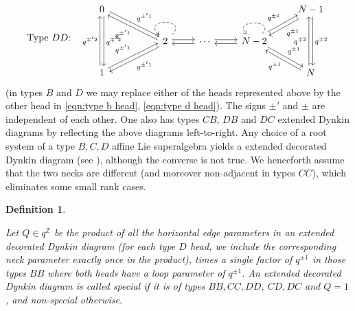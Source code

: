 \documentclass{amsart}
\newtheorem{definition}[subsection]{Definition}
\def\BZ{{\mathbb{Z}}}
\begin{document}
\begin{equation}
\label{eqn:dynkin dd}
\text{Type $DD$:} \quad \begin{tikzcd}
0 &[1cm]&&& N-1 \\
& 2 & \cdots & {N-2} & \\
1 &&&& N
\arrow["q^{\pm' 1}", shift left=2pt, from=1-1, to=2-2]
\arrow["q^{\pm' 1}", shift left=2pt, from=2-2, to=1-1]
\arrow["q^{\pm' 1}", shift left=2pt, from=3-1, to=2-2]
\arrow["q^{\pm' 1}", shift left=2pt, from=2-2, to=3-1]
\arrow["q^{\pm 1}", shift left=2pt, from=1-5, to=2-4]
\arrow["q^{\pm 1}", shift left=2pt, from=2-4, to=1-5]
\arrow["q^{\pm 1}", shift left=2pt, from=3-5, to=2-4]
\arrow["q^{\pm 1}", shift left=2pt, from=2-4, to=3-5]
\arrow["q^{\mp 2}", shift left=2pt, from=3-5, to=1-5]
\arrow["q^{\mp 2}", shift left=2pt, from=1-5, to=3-5]
\arrow["q^{\mp' 2}", shift left=2pt, from=3-1, to=1-1]
\arrow["q^{\mp' 2}", shift left=2pt, from=1-1, to=3-1]
\arrow[shift left=2pt, from=2-4, to=2-3]
\arrow[shift left=2pt, from=2-3, to=2-4]
\arrow[shift left=2pt, from=2-3, to=2-2]
\arrow[shift left=2pt, from=2-2, to=2-3]
\arrow[dashed,from=2-2, to=2-2, looseness=4.5]
\arrow[dashed,  from=2-4, to=2-4, looseness=3.3]
\end{tikzcd}
\end{equation}
(in types $B$ and $D$ we may replace either of the heads represented above by the other head in \eqref{eqn:type b head}, \eqref{eqn:type d head}). The signs $\pm'$ and $\pm$ are independent of each other. One also has types $CB$, $DB$ and $DC$ extended Dynkin diagrams by reflecting the above diagrams left-to-right. Any choice of a root system of a type $B,C,D$ affine Lie superalgebra yields a extended decorated Dynkin diagram (see \cite{Y2}), although the converse is not true. We henceforth assume that the two necks are different (and moreover non-adjacent in types $CC$), which eliminates some small rank cases.

\medskip 

\begin{definition}
\label{def:special}

Let $Q \in q^{\BZ}$ be the product of all the horizontal edge parameters in an extended decorated Dynkin diagram (for each type $D$ head, we include the corresponding neck parameter exactly once in the product), times a single factor of $q^{\pm 1}$ in those types $BB$ where both heads have a loop parameter of $q^{\pm 1}$. An extended decorated Dynkin diagram is called \emph{special} if it is of types $BB, CC, DD$, $CD, DC$ and $Q = 1$, and \emph{non-special} otherwise.

\end{definition}
\end{document}
